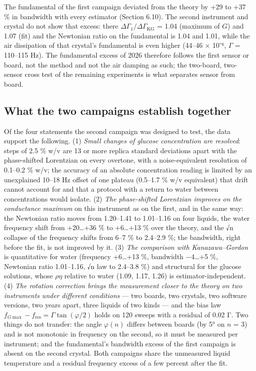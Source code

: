 \documentclass[11pt,a4paper]{article}
\begin{document}
The fundamental of the first campaign deviated from the theory by +29 to
+37 \% in bandwidth with every estimator (Section 6.10). The second
instrument and crystal do not show that excess: there
\(\Delta\Gamma_1/\Delta\Gamma_\mathrm{KG}\) = 1.04 (maximum of \(G\))
and 1.07 (fit) and the Newtonian ratio on the fundamental is 1.04 and
1.01, while the air dissipation of that crystal's fundamental is even
higher (44--46 × 10⁻⁶, \(\Gamma\) = 110--115 Hz). The fundamental excess
of 2026 therefore follows the first sensor or board, not the method and
not the air damping as such; the two-board, two-sensor cross test of the
remaining experiments is what separates sensor from board.

\hypertarget{what-the-two-campaigns-establish-together}{%
\subsection{What the two campaigns establish
together}\label{what-the-two-campaigns-establish-together}}

Of the four statements the second campaign was designed to test, the
data support the following. (1) \emph{Small changes of glucose
concentration are resolved}: steps of 2.5 \% w/v are 13 or more replica
standard deviations apart with the phase-shifted Lorentzian on every
overtone, with a noise-equivalent resolution of 0.1--0.2 \% w/v; the
accuracy of an absolute concentration reading is limited by an
unexplained 10--18 Hz offset of one plateau (0.5--1.7 \% w/v equivalent)
that drift cannot account for and that a protocol with a return to water
between concentrations would isolate. (2) \emph{The phase-shifted
Lorentzian improves on the conductance maximum} on this instrument as on
the first, and in the same way: the Newtonian ratio moves from
1.20--1.41 to 1.01--1.16 on four liquids, the water frequency shift from
+20\ldots+36 \% to +6\ldots+13 \% over the theory, and the √n collapse
of the frequency shifts from 6--7 \% to 2.4--2.9 \%; the bandwidth,
right before the fit, is not improved by it. (3) \emph{The comparison
with Kanazawa--Gordon} is quantitative for water (frequency +6\ldots+13
\%, bandwidth −4\ldots+5 \%, Newtonian ratio 1.01--1.16, √n law to
2.4--3.8 \%) and structural for the glucose solutions, whose
\(\rho\eta\) relative to water (1.09, 1.17, 1.26) is
estimator-independent. (4) \emph{The rotation correction brings the
measurement closer to the theory on two instruments under different
conditions} --- two boards, two crystals, two software versions, two
years apart, three liquids of two kinds --- and the bias law
\(f_{G\max} - f_\mathrm{res} = \Gamma\tan(\varphi/2)\) holds on 120
sweeps with a residual of 0.02 Γ. Two things do not transfer: the angle
\(\varphi(n)\) differs between boards (by 5° on \(n\) = 3) and is not
monotonic in frequency on the second, so it must be measured per
instrument; and the fundamental's bandwidth excess of the first campaign
is absent on the second crystal. Both campaigns share the unmeasured
liquid temperature and a residual frequency excess of a few percent
after the fit.
\end{document}
